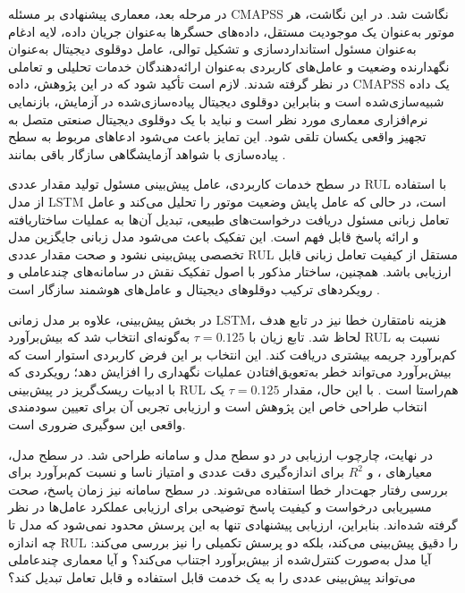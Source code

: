 \documentclass[a4paper,fleqn]{report}
\begin{document}
در مرحله بعد، معماری پیشنهادی بر مسئله \gls{CMAPSS} نگاشت شد. در
این نگاشت، هر موتور به‌عنوان یک موجودیت مستقل، داده‌های حسگرها
به‌عنوان جریان داده، لایه ادغام به‌عنوان مسئول استانداردسازی و
تشکیل توالی، عامل دوقلوی دیجیتال به‌عنوان نگهدارنده وضعیت و
عامل‌های کاربردی به‌عنوان ارائه‌دهندگان خدمات تحلیلی و تعاملی
در نظر گرفته شدند. لازم است تأکید شود که در این پژوهش، داده
\gls{CMAPSS} یک داده شبیه‌سازی‌شده است و بنابراین دوقلوی دیجیتال
پیاده‌سازی‌شده در آزمایش، بازنمایی نرم‌افزاری معماری مورد نظر
است و نباید با یک دوقلوی دیجیتال صنعتی متصل به تجهیز واقعی
یکسان تلقی شود. این تمایز باعث می‌شود ادعاهای مربوط به سطح
پیاده‌سازی با شواهد آزمایشگاهی سازگار باقی بمانند
\cite{qi2021enabling,tao2018digital}.

در سطح خدمات کاربردی، عامل پیش‌بینی مسئول تولید مقدار عددی
\gls{RUL} با استفاده از مدل \gls{LSTM} است، در حالی که عامل
پایش وضعیت موتور را تحلیل می‌کند و عامل تعامل زبانی مسئول
دریافت درخواست‌های طبیعی، تبدیل آن‌ها به عملیات ساختاریافته و
ارائه پاسخ قابل فهم است. این تفکیک باعث می‌شود مدل زبانی جایگزین
مدل تخصصی پیش‌بینی نشود و صحت مقدار عددی \gls{RUL} مستقل از
کیفیت تعامل زبانی قابل ارزیابی باشد. همچنین، ساختار مذکور با
اصول تفکیک نقش در سامانه‌های چندعاملی و رویکردهای ترکیب
دوقلوهای دیجیتال و عامل‌های هوشمند سازگار است
\cite{lopez2024madtwin,pretel2022masdt}.

در بخش پیش‌بینی، علاوه بر مدل زمانی \gls{LSTM}، هزینه نامتقارن
خطا نیز در تابع هدف لحاظ شد. تابع زیان  با
$\tau=0.125$ به‌گونه‌ای انتخاب شد که بیش‌برآورد \gls{RUL} نسبت
به کم‌برآورد جریمه بیشتری دریافت کند. این انتخاب بر این فرض
کاربردی استوار است که بیش‌برآورد می‌تواند خطر به‌تعویق‌افتادن
عملیات نگهداری را افزایش دهد؛ رویکردی که با ادبیات
ریسک‌گریز در پیش‌بینی \gls{RUL} هم‌راستا است
\cite{Robinson2026riskaware}. با این حال، مقدار $\tau=0.125$
یک انتخاب طراحی خاص این پژوهش است و ارزیابی تجربی آن برای
تعیین سودمندی واقعی این سوگیری ضروری است.

در نهایت، چارچوب ارزیابی در دو سطح مدل و سامانه طراحی شد. در
سطح مدل، معیارهای ،  و $R^2$ برای اندازه‌گیری
دقت عددی و امتیاز ناسا و نسبت کم‌برآورد برای بررسی رفتار
جهت‌دار خطا استفاده می‌شوند. در سطح سامانه نیز زمان پاسخ،
صحت مسیریابی درخواست و کیفیت پاسخ توضیحی برای ارزیابی عملکرد
عامل‌ها در نظر گرفته شده‌اند. بنابراین، ارزیابی پیشنهادی تنها
به این پرسش محدود نمی‌شود که مدل تا چه اندازه \gls{RUL} را
دقیق پیش‌بینی می‌کند، بلکه دو پرسش تکمیلی را نیز بررسی می‌کند:
آیا مدل به‌صورت کنترل‌شده از بیش‌برآورد اجتناب می‌کند؟ و آیا
معماری چندعاملی می‌تواند پیش‌بینی عددی را به یک خدمت قابل
استفاده و قابل تعامل تبدیل کند؟
\end{document}
